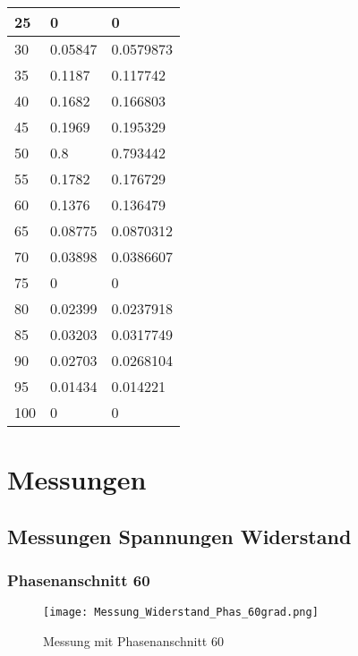 \begin{appendix}
\begin{minipage}{0.49\textwidth}
\begin{tabular}{|l|l|l|}
		25       & 0       & 0         \\ \hline
		30       & 0.05847 & 0.0579873 \\ \hline
		35       & 0.1187  & 0.117742  \\ \hline
		40       & 0.1682  & 0.166803  \\ \hline
		45       & 0.1969  & 0.195329  \\ \hline
		50       & 0.8     & 0.793442  \\ \hline
		55       & 0.1782  & 0.176729  \\ \hline
		60       & 0.1376  & 0.136479  \\ \hline
		65       & 0.08775 & 0.0870312 \\ \hline
		70       & 0.03898 & 0.0386607 \\ \hline
		75       & 0       & 0         \\ \hline
		80       & 0.02399 & 0.0237918 \\ \hline
		85       & 0.03203 & 0.0317749 \\ \hline
		90       & 0.02703 & 0.0268104 \\ \hline
		95       & 0.01434 & 0.014221  \\ \hline
		100      & 0       & 0         \\ \hline
	\end{tabular}
\label{tab:Schwing_80_Vergleich}
\end{minipage}


\newpage
\section{Messungen}
\subsection{Messungen Spannungen Widerstand}\label{sec:Mess_Spannung_Widerstand}
\subsubsection*{Phasenanschnitt 60\textdegree}

\begin{figure}[ht!]
	\centering
	\texttt{[image: Messung\_Widerstand\_Phas\_60grad.png]}	
	\caption{Messung mit Phasenanschnitt 60\textdegree}\label{fig:Mess_Phas_60}
\end{figure}


\end{appendix}
